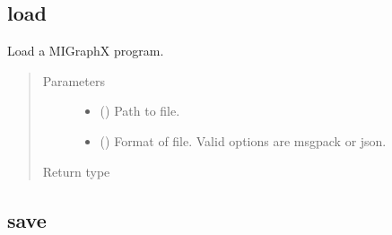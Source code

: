 \documentclass[letterpaper,10pt,english]{sphinxmanual}
\begin{document}
\subsection{load}
\label{\detokenize{reference/py:load}}

\begin{fulllineitems}
\label{\detokenize{reference/py:migraphx.load}}
\sphinxAtStartPar
Load a MIGraphX program.
\begin{quote}\begin{description}
\item[{Parameters}] \leavevmode\begin{itemize}
\item {} 
\sphinxAtStartPar
{} () \textendash{} Path to file.

\item {} 
\sphinxAtStartPar
{} () \textendash{} Format of file. Valid options are msgpack or json.

\end{itemize}

\item[{Return type}] \leavevmode
\sphinxAtStartPar
{\hyperref[\detokenize{reference/py:migraphx.program}]{}}

\end{description}\end{quote}

\end{fulllineitems}



\subsection{save}
\label{\detokenize{reference/py:save}}
\end{document}
